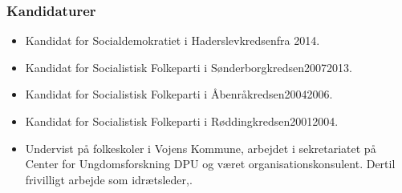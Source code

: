 \documentclass[11pt, a4paper]{awesome-cv}
\begin{document}
\begin{cvletter}
\subsubsection*{Kandidaturer}
\begin{itemize}
\item Kandidat for Socialdemokratiet i Haderslevkredsenfra 2014.
\item Kandidat for Socialistisk Folkeparti i Sønderborgkredsen20072013.
\item Kandidat for Socialistisk Folkeparti i Åbenråkredsen20042006.
\item Kandidat for Socialistisk Folkeparti i Røddingkredsen20012004.
\end{itemize}
\begin{itemize}
\item Undervist på folkeskoler i Vojens Kommune, arbejdet i sekretariatet på Center for Ungdomsforskning DPU og været organisationskonsulent. Dertil frivilligt arbejde som idrætsleder,.
\end{itemize}
\end{cvletter}
\end{document}
